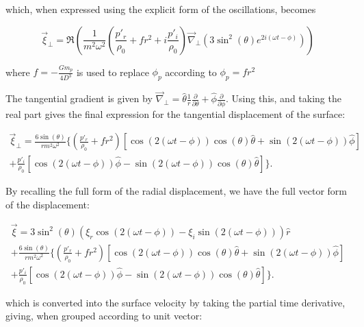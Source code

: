 \documentclass[11pt]{amsart}
\begin{document}
which, when expressed using the explicit form of the oscillations, becomes

\begin{equation}
\vec{\xi}_{\perp} = \Re \left(   \frac{1}{m^{2} \omega^{2}}  \left(   \frac{p'_{r}}{\rho_{0}}  +  f r^{2} + i \frac{p'_{i}}{\rho_{0}}   \right)   \vec{\nabla}_{\perp}  \left(   3 \sin^{2}(\theta) e^{2 i ( \omega t - \phi)}   \right)  \right)
\end{equation}

where $f = - \frac{G m_{p}}{4 D^{3}}$ is used to replace $\phi_{p}$ according to $\phi_{p} = f r^{2}$

The tangential gradient is given by $\vec{\nabla}_{\perp} = \hat{\theta} \frac{1}{r} \frac{\partial}{\partial \theta} + \hat{\phi} \frac{\partial}{\partial \phi}$.  Using this, and taking the real part gives the final expression for the tangential displacement of the surface:

\begin{multline}
\vec{\xi}_{\perp} =    \frac{6 \sin(\theta)}{r m^{2} \omega^{2}}  \Bigg\{  \left(   \frac{p'_{r}}{\rho_{0}}  +  f r^{2} \right) \left[ \cos(2( \omega t - \phi )) \cos(\theta) \hat{\theta}  +  \sin(2( \omega t - \phi )) \hat{\phi} \right] \\
 + \frac{p'_{i}}{\rho_{0}}  \left[ \cos(2( \omega t - \phi )) \hat{\phi}  -  \sin(2( \omega t - \phi )) \cos(\theta) \hat{\theta} \right]    \Bigg\}.
\end{multline}

By recalling the full form of the radial displacement, we have the full vector form of the displacement:

\begin{multline}
\vec{\xi} =    3 \sin^{2}(\theta) \left(  \xi_{r} \cos \left( 2 ( \omega t - \phi) \right)  - \xi_{i} \sin \left( 2 ( \omega t - \phi) \right) \right) \hat{r} \\
+ \frac{6 \sin(\theta)}{r m^{2} \omega^{2}}  \Bigg\{  \left(   \frac{p'_{r}}{\rho_{0}}  +  f r^{2} \right) \left[ \cos(2( \omega t - \phi )) \cos(\theta) \hat{\theta}  +  \sin(2( \omega t - \phi )) \hat{\phi} \right] \\
 + \frac{p'_{i}}{\rho_{0}}  \left[ \cos(2( \omega t - \phi )) \hat{\phi}  -  \sin(2( \omega t - \phi )) \cos(\theta) \hat{\theta} \right]    \Bigg\}.
\end{multline}

which is converted into the surface velocity by taking the partial time derivative, giving, when grouped according to unit vector:
\end{document}
